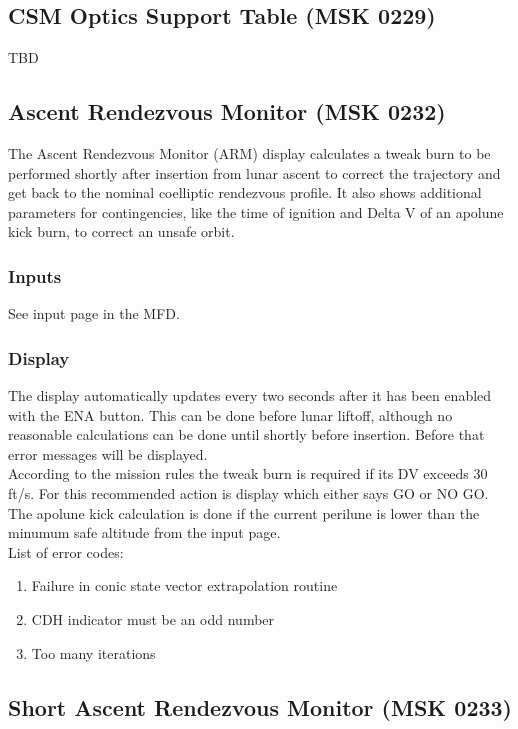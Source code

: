 \documentclass[11pt]{article} %
\begin{document}
\subsection{CSM Optics Support Table (MSK 0229)}

TBD
\newpage
\subsection{Ascent Rendezvous Monitor (MSK 0232)}

The Ascent Rendezvous Monitor (ARM) display calculates a tweak burn to be performed shortly after insertion from lunar ascent to correct the trajectory and get back to the nominal coelliptic rendezvous profile. It also shows additional parameters for contingencies, like the time of ignition and Delta V of an apolune kick burn, to correct an unsafe orbit.
\subsubsection{Inputs}
See input page in the MFD.
\subsubsection{Display}
The display automatically updates every two seconds after it has been enabled with the ENA button. This can be done before lunar liftoff, although no reasonable calculations can be done until shortly before insertion. Before that error messages will be displayed.\\

According to the mission rules the tweak burn is required if its DV exceeds 30 ft/s. For this recommended action is display which either says GO or NO GO. The apolune kick calculation is done if the current perilune is lower than the minumum safe altitude from the input page.\\

List of error codes:
\begin{enumerate}
	\item Failure in conic state vector extrapolation routine
	\item CDH indicator must be an odd number
	\item Too many iterations
\end{enumerate}
\newpage
\subsection{Short Ascent Rendezvous Monitor (MSK 0233)}
\end{document}
